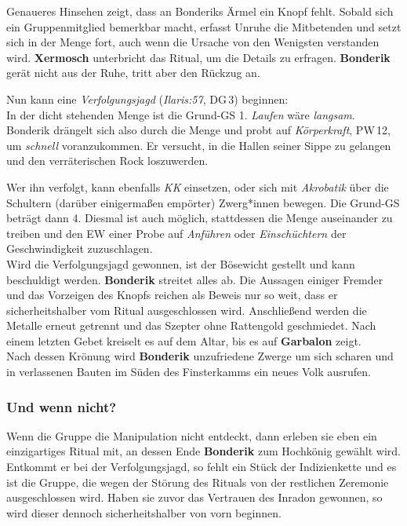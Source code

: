 
Genaueres Hinsehen zeigt, dass an Bonderiks Ärmel ein Knopf fehlt. Sobald sich ein Gruppenmitglied bemerkbar macht, erfasst Unruhe die Mitbetenden und setzt sich in der Menge fort, auch wenn die Ursache von den Wenigsten verstanden wird. \textbf{Xermosch} unterbricht das Ritual, um die Details zu erfragen.
\textbf{Bonderik} gerät nicht aus der Ruhe, tritt aber den Rückzug an.

Nun kann eine \emph{Verfolgungsjagd} (\emph{Ilaris:57}, DG\,3) beginnen:\\
In der dicht stehenden Menge ist die Grund-GS 1. \emph{Laufen} wäre \emph{langsam}.
Bonderik drängelt sich also durch die Menge und probt auf \emph{Körperkraft}, PW\,12, um \emph{schnell} voranzukommen. Er versucht, in die Hallen seiner Sippe zu gelangen und den verräterischen Rock loszuwerden.

Wer ihn verfolgt, kann ebenfalls \emph{KK} einsetzen, oder sich mit \emph{Akrobatik} über die Schultern (darüber einigermaßen empörter) Zwerg*innen bewegen. Die Grund-GS beträgt dann 4. Diesmal ist auch möglich, stattdessen die Menge auseinander zu treiben und den EW einer Probe auf \emph{Anführen} oder \emph{Einschüchtern} der Geschwindigkeit zuzuschlagen.\\
Wird die Verfolgungsjagd gewonnen, ist der Bösewicht gestellt und kann beschuldigt werden.
\textbf{Bonderik} streitet alles ab. Die Aussagen einiger Fremder und das Vorzeigen des Knopfs reichen als Beweis nur so weit, dass er sicherheitshalber vom Ritual ausgeschlossen wird. Anschließend werden die Metalle erneut getrennt und das Szepter ohne Rattengold geschmiedet. Nach einem letzten Gebet kreiselt es auf dem Altar, bis es auf \textbf{Garbalon} zeigt.\\
Nach dessen Krönung wird \textbf{Bonderik} unzufriedene Zwerge um sich scharen und in verlassenen Bauten im Süden des Finsterkamms ein neues Volk ausrufen.
\subsubsection{Und wenn nicht?}
Wenn die Gruppe die Manipulation nicht entdeckt, dann erleben sie eben ein einzigartiges Ritual mit, an dessen Ende \textbf{Bonderik} zum Hochkönig gewählt wird.
Entkommt er bei der Verfolgungsjagd, so fehlt ein Stück der Indizienkette und es ist die Gruppe, die wegen der Störung des Rituals von der restlichen Zeremonie ausgeschlossen wird.
Haben sie zuvor das Vertrauen des Inradon gewonnen, so wird dieser dennoch sicherheitshalber von vorn beginnen.
